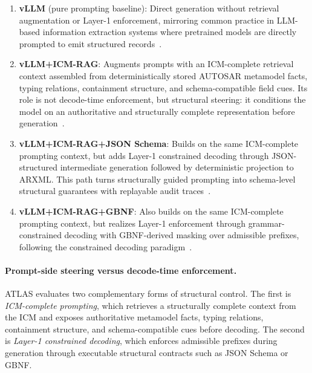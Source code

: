 \documentclass[acmlarge,nonacm]{acmart}
\theoremstyle{acmplain}
\theoremstyle{acmdefinition}
\begin{document}
\begin{enumerate}[leftmargin=*,nosep]
\item \textbf{vLLM} (pure prompting baseline): Direct generation without retrieval augmentation or Layer-1 enforcement, mirroring common practice in LLM-based information extraction systems where pretrained models are directly prompted to emit structured records~\cite{Dagdelen2024, Lu2022}.

\item \textbf{vLLM+ICM-RAG}: Augments prompts with an ICM-complete retrieval context assembled from deterministically stored AUTOSAR metamodel facts, typing relations, containment structure, and schema-compatible field cues. Its role is not decode-time enforcement, but structural steering: it conditions the model on an authoritative and structurally complete representation before generation~\cite{el-gnainyAIEnhancedAUTOSARConfiguration2024a,Jiao2024}.

\item \textbf{vLLM+ICM-RAG+JSON Schema}: Builds on the same ICM-complete prompting context, but adds Layer-1 constrained decoding through JSON-structured intermediate generation followed by deterministic projection to ARXML. This path turns structurally guided prompting into schema-level structural guarantees with replayable audit traces~\cite{Lu2025b}.

\item \textbf{vLLM+ICM-RAG+GBNF}: Also builds on the same ICM-complete prompting context, but realizes Layer-1 enforcement through grammar-constrained decoding with GBNF-derived masking over admissible prefixes, following the constrained decoding paradigm~\cite{scholakPICARDParsingIncrementally2021,Dong2024XGrammar,Park2025}.
\end{enumerate}


\paragraph{Prompt-side steering versus decode-time enforcement.}
ATLAS evaluates two complementary forms of structural control. The first is \emph{ICM-complete prompting}, which retrieves a structurally complete context from the ICM and exposes authoritative metamodel facts, typing relations, containment structure, and schema-compatible cues before decoding. The second is \emph{Layer-1 constrained decoding}, which enforces admissible prefixes during generation through executable structural contracts such as JSON Schema or GBNF.
\end{document}
